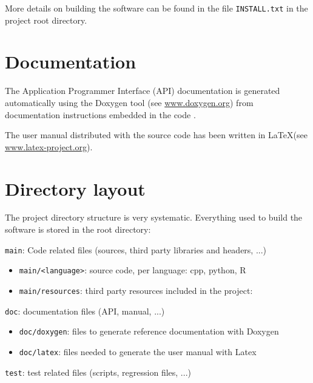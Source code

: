 More details on building the software can be found in the file \texttt{INSTALL.txt} in the project root directory.


%
\section{Documentation}
\label{section:documentation}

The Application Programmer Interface (API) documentation is generated automatically
using the Doxygen tool (see \url{www.doxygen.org}) from documentation instructions
embedded in the code . 

The user manual distributed with the source code has been written in \LaTeX (see \url{www.latex-project.org}).



%
\section{Directory layout}

The project directory structure is very systematic.
Everything used to build the software is stored in the root directory:
\begin{compactitem}
    \item \texttt{main}: Code related files (sources, third party libraries and headers, ...)
      	\begin{itemize}
        		\item \texttt{main/<language>}: source code, per language: cpp, python, R
        		\item \texttt{main/resources}: third party resources included in the project:
        \end{itemize}
    \item \texttt{doc}: documentation files (API, manual, ...)
      	\begin{itemize}
        		\item \texttt{doc/doxygen}: files to generate reference documentation with Doxygen
        		\item \texttt{doc/latex}: files needed to generate the user manual with Latex
        \end{itemize}
    \item \texttt{test}: test related files (scripts, regression files, ...)
\end{compactitem}


